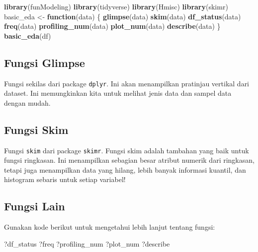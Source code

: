 \documentclass[
]{book}
\newenvironment{Shaded}{\begin{snugshade}}{\end{snugshade}}
\newcommand{\ControlFlowTok}[1]{\textcolor[rgb]{0.13,0.29,0.53}{\textbf{#1}}}
\newcommand{\KeywordTok}[1]{\textcolor[rgb]{0.13,0.29,0.53}{\textbf{#1}}}
\newcommand{\NormalTok}[1]{#1}
\newcommand{\StringTok}[1]{\textcolor[rgb]{0.31,0.60,0.02}{#1}}
\begin{document}
\begin{Shaded}
\begin{Highlighting}[]
\KeywordTok{library}\NormalTok{(funModeling) }
\KeywordTok{library}\NormalTok{(tidyverse) }
\KeywordTok{library}\NormalTok{(Hmisc)}
\KeywordTok{library}\NormalTok{(skimr)}
\NormalTok{basic_eda <-}\StringTok{ }\ControlFlowTok{function}\NormalTok{(data)}
\NormalTok{\{}
  \KeywordTok{glimpse}\NormalTok{(data)}
  \KeywordTok{skim}\NormalTok{(data)}
  \KeywordTok{df_status}\NormalTok{(data)}
  \KeywordTok{freq}\NormalTok{(data) }
  \KeywordTok{profiling_num}\NormalTok{(data)}
  \KeywordTok{plot_num}\NormalTok{(data)}
  \KeywordTok{describe}\NormalTok{(data)}
\NormalTok{\}}
\KeywordTok{basic_eda}\NormalTok{(df)}
\end{Highlighting}
\end{Shaded}

\hypertarget{fungsi-glimpse}{%
\subsection{Fungsi Glimpse}\label{fungsi-glimpse}}

Fungsi sekilas dari package \texttt{dplyr}. Ini akan menampilkan pratinjau vertikal dari dataset. Ini memungkinkan kita untuk melihat jenis data dan sampel data dengan mudah.

\hypertarget{fungsi-skim}{%
\subsection{Fungsi Skim}\label{fungsi-skim}}

Fungsi \texttt{skim} dari package \texttt{skimr}. Fungsi skim adalah tambahan yang baik untuk fungsi ringkasan. Ini menampilkan sebagian besar atribut numerik dari ringkasan, tetapi juga menampilkan data yang hilang, lebih banyak informasi kuantil, dan histogram sebaris untuk setiap variabel!

\hypertarget{fungsi-lain}{%
\subsection{Fungsi Lain}\label{fungsi-lain}}

Gunakan kode berikut untuk mengetahui lebih lanjut tentang fungsi:

\begin{Shaded}
\begin{Highlighting}[]
\NormalTok{?df_status}
\NormalTok{?freq}
\NormalTok{?profiling_num}
\NormalTok{?plot_num}
\NormalTok{?describe}
\end{Highlighting}
\end{Shaded}
\end{document}
